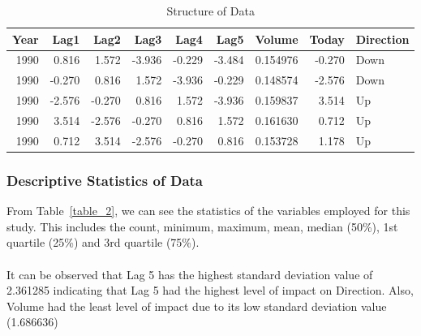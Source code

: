 \documentclass[12pt]{article}
\begin{document}
\begin{table}[h!]
\begin{tabular}{rrrrrrrrl}
	\hline
	Year &   Lag1 &   Lag2 &   Lag3 &   Lag4 &   Lag5 &    Volume &  Today & Direction \\
	\hline
	1990 &  0.816 &  1.572 & -3.936 & -0.229 & -3.484 &  0.154976 & -0.270 &      Down \\
	1990 & -0.270 &  0.816 &  1.572 & -3.936 & -0.229 &  0.148574 & -2.576 &      Down \\
	1990 & -2.576 & -0.270 &  0.816 &  1.572 & -3.936 &  0.159837 &  3.514 &        Up \\
	1990 &  3.514 & -2.576 & -0.270 &  0.816 &  1.572 &  0.161630 &  0.712 &        Up \\
	1990 &  0.712 &  3.514 & -2.576 & -0.270 &  0.816 &  0.153728 &  1.178 &        Up \\
	\hline
\end{tabular}
\caption{Structure of Data}
\label{table_1}
\end{table}

\subsubsection{Descriptive Statistics of Data}

From Table~\ref{table_2}, we can see the statistics of the variables employed for this study. This includes the count, minimum, maximum, mean, median (50\%), 1st quartile (25\%) and 3rd quartile (75\%).\\\\
It can be observed that Lag 5 has the highest standard deviation value of 2.361285 indicating that Lag 5 had the highest level of impact on Direction. Also, Volume had the least level of impact due to its low standard deviation value (1.686636)
\end{document}
